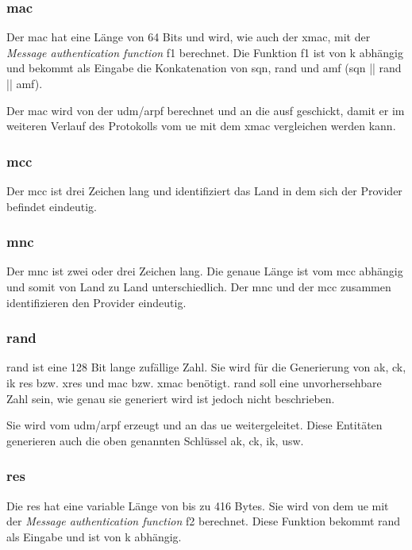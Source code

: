 \subsubsection{\gls{mac}}
Der \gls{mac} hat eine Länge von 64 Bits und wird, wie auch der \gls{xmac}, mit der \textit{Message authentication function} f1 berechnet. %
Die Funktion f1 ist von \gls{k} abhängig und bekommt als Eingabe die Konkatenation von \gls{sqn}, \gls{rand} und \gls{amf} (\gls{sqn} || \gls{rand} || \gls{amf}). %

Der \gls{mac} wird von der \gls{udm}/\gls{arpf} berechnet und an die \gls{ausf} geschickt, damit er im weiteren Verlauf des Protokolls vom \gls{ue} mit dem \gls{xmac} vergleichen werden kann.

\subsubsection{\gls{mcc}}
Der \gls{mcc} ist drei Zeichen lang und identifiziert das Land in dem sich der Provider befindet eindeutig. %

\subsubsection{\gls{mnc}}
Der \gls{mnc} ist zwei oder drei Zeichen lang. %
Die genaue Länge ist vom \gls{mcc} abhängig und somit von Land zu Land unterschiedlich.
Der \gls{mnc} und der \gls{mcc} zusammen identifizieren den Provider eindeutig.


\subsubsection{\gls{rand}}
\gls{rand} ist eine 128 Bit lange zufällige Zahl. %
Sie wird für die Generierung von \gls{ak}, \gls{ck}, \gls{ik} \gls{res} bzw. \gls{xres} und \gls{mac} bzw. \gls{xmac} benötigt. 
\gls{rand} soll eine unvorhersehbare Zahl sein, wie genau sie generiert wird ist jedoch nicht beschrieben. %

Sie wird vom \gls{udm}/\gls{arpf} erzeugt und an das \gls{ue} weitergeleitet. Diese Entitäten generieren auch die oben genannten Schlüssel \gls{ak}, \gls{ck}, \gls{ik}, usw.

\subsubsection{\gls{res}}
Die \gls{res} hat eine variable Länge von bis zu 416 Bytes. %
Sie wird von dem \gls{ue} mit der \textit{Message authentication function} f2 berechnet.
Diese Funktion bekommt \gls{rand} als Eingabe und ist von \gls{k} abhängig. %


